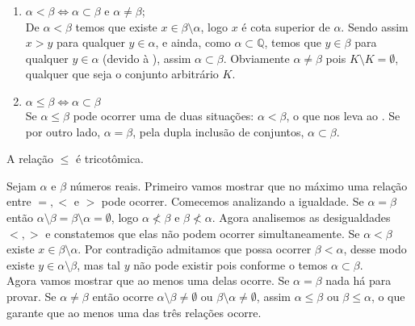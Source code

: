 \documentclass[../main.tex]{subfiles}
\begin{document}
\begin{dem}
    \begin{enumerate}[label=(\roman*)]
        \item\label{reais-dummy-subset} $\alpha < \beta \iff \alpha \subset \beta$ e $\alpha \neq \beta$; \\
        De $\alpha < \beta$ temos que existe $x \in \beta \setminus \alpha$, logo $x$ é cota superior de $\alpha$. Sendo assim $x > y$ para qualquer $y \in \alpha$, e ainda, como $\alpha \subset \mathbb{Q}$, temos que $y \in \beta$ para qualquer $y \in \alpha$ (devido à ), assim $\alpha \subset \beta$. Obviamente $\alpha \neq \beta$ pois $K \setminus K  = \emptyset$, qualquer que seja o conjunto arbitrário $K$.    
        \item $\alpha \leq \beta \iff \alpha \subset \beta$ \\
        Se $\alpha \leq \beta$ pode ocorrer uma de duas situações: $\alpha < \beta$, o que nos leva ao . Se por outro lado, $\alpha = \beta$, pela dupla inclusão de conjuntos, $\alpha \subset \beta$. 
    \end{enumerate}
\end{dem}

\begin{teo}\label{reais-teo-ordemTricotomica}
    A relação $\leq$ é tricotômica.
\end{teo}
\begin{dem}
    Sejam $\alpha$ e $\beta$ números reais.
    Primeiro vamos mostrar que no máximo uma relação entre $=, <$ e $>$ pode ocorrer.
    Comecemos analizando a igualdade. Se $\alpha = \beta$ então $\alpha \setminus \beta = \beta \setminus \alpha = \emptyset$, logo $\alpha \not< \beta$ e $\beta \not< \alpha$.
    Agora analisemos as desigualdades $<, >$ e constatemos que elas não podem ocorrer simultaneamente. Se $\alpha < \beta$ existe $x \in \beta \setminus \alpha$. Por contradição admitamos que possa ocorrer $\beta < \alpha$, desse modo existe $y \in \alpha \setminus \beta$, mas tal $y$ não pode existir pois conforme o  temos $\alpha \subset \beta$. \\

    Agora vamos mostrar que ao menos uma delas ocorre. Se $\alpha = \beta$ nada há para provar. Se $\alpha \neq \beta$ então ocorre $\alpha \setminus \beta \neq \emptyset$ ou $\beta \setminus \alpha \neq \emptyset$, assim $\alpha \leq \beta$ ou $\beta \leq \alpha$, o que garante que ao menos uma das três relações ocorre.
\end{dem}
\end{document}
